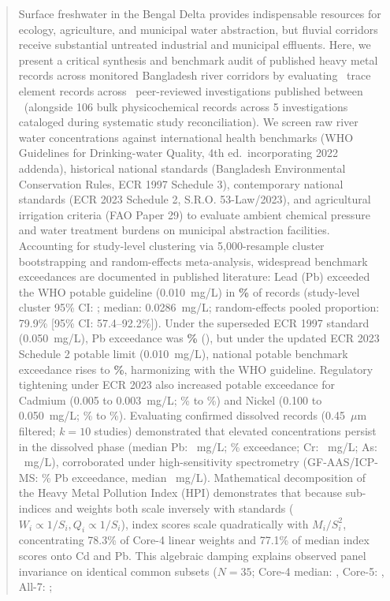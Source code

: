 \documentclass[authoryear,preprint,12pt]{elsarticle}
\begin{document}
\begin{frontmatter}
\begin{abstract}
Surface freshwater in the Bengal Delta provides indispensable resources for ecology, agriculture, and municipal water abstraction, but fluvial corridors receive substantial untreated industrial and municipal effluents. Here, we present a critical synthesis and benchmark audit of published heavy metal records across monitored Bangladesh river corridors by evaluating \TotalMetalRecords\ trace element records across \TotalMetalStudies\ peer-reviewed investigations published between \StudyWindowYears\ (alongside 106 bulk physicochemical records across 5 investigations cataloged during systematic study reconciliation). We screen raw river water concentrations against international health benchmarks (WHO Guidelines for Drinking-water Quality, 4th ed.\ incorporating 2022 addenda), historical national standards (Bangladesh Environmental Conservation Rules, ECR 1997 Schedule 3), contemporary national standards (ECR 2023 Schedule 2, S.R.O. 53-Law/2023), and agricultural irrigation criteria (FAO Paper 29) to evaluate ambient chemical pressure and water treatment burdens on municipal abstraction facilities. Accounting for study-level clustering via 5,000-resample cluster bootstrapping and random-effects meta-analysis, widespread benchmark exceedances are documented in published literature: Lead (Pb) exceeded the WHO potable guideline (0.010~mg/L) in \textbf{\LeadWhoExceedPct\%} of records (study-level cluster 95\% CI: \LeadWhoClusterCi; median: 0.0286~mg/L; random-effects pooled proportion: 79.9\% [95\% CI: 57.4--92.2\%]). Under the superseded ECR 1997 standard (0.050~mg/L), Pb exceedance was \textbf{\LeadBdNineteenNinetySevenExceedPct\%} (\LeadBdClusterCi), but under the updated ECR 2023 Schedule 2 potable limit (0.010~mg/L), national potable benchmark exceedance rises to \textbf{\LeadBdTwentyTwentyThreeExceedPct\%}, harmonizing with the WHO guideline. Regulatory tightening under ECR 2023 also increased potable exceedance for Cadmium (0.005 to 0.003~mg/L; \CadmiumBdNineteenNinetySevenExceedPct\% to \CadmiumBdTwentyTwentyThreeExceedPct\%) and Nickel (0.100 to 0.050~mg/L; \NickelBdNineteenNinetySevenExceedPct\% to \NickelBdTwentyTwentyThreeExceedPct\%). Evaluating confirmed dissolved records (0.45~$\mu\text{m}$ filtered; $k=10$ studies) demonstrated that elevated concentrations persist in the dissolved phase (median Pb: \LeadConfirmedDissolvedMedian~mg/L; \LeadConfirmedDissolvedWhoPct\% exceedance; Cr: \ChromiumConfirmedDissolvedMedian~mg/L; As: \ArsenicConfirmedDissolvedMedian~mg/L), corroborated under high-sensitivity spectrometry (GF-AAS/ICP-MS: \LeadHighSensExceedPct\% Pb exceedance, median \LeadHighSensMedian~mg/L). Mathematical decomposition of the Heavy Metal Pollution Index ($\mathrm{HPI}$) demonstrates that because sub-indices and weights both scale inversely with standards ($W_i \propto 1/S_i, Q_i \propto 1/S_i$), index scores scale quadratically with $M_i/S_i^2$, concentrating 78.3\% of Core-4 linear weights and 77.1\% of median index scores onto Cd and Pb. This algebraic damping explains observed panel invariance on identical common subsets ($N=35$; Core-4 median: \HpiCommonSubsetCoreFourMedian, Core-5: \HpiCommonSubsetCoreFiveMedian, All-7: \HpiCommonSubsetAllSevenMedian; 
\end{abstract}
\end{frontmatter}
\end{document}
